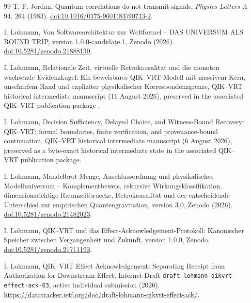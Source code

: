 \documentclass[11pt]{article}
\theoremstyle{remark}
\begin{document}
\begin{thebibliography}{99}
T. F. Jordan, Quantum correlations do not transmit signals,
\emph{Physics Letters A} 94, 264 (1983).
\href{https://doi.org/10.1016/0375-9601(83)90713-2}{doi:10.1016/0375-9601(83)90713-2}.

I. Lohmann, Von Softwarearchitektur zur Weltformel -- DAS UNIVERSUM ALS
ROUND TRIP, version 1.0.0-candidate.1, Zenodo (2026).
\href{https://doi.org/10.5281/zenodo.21888130}{doi:10.5281/zenodo.21888130}.

I. Lohmann, Relationale Zeit, virtuelle Retrokausalitat und die monoton
wachsende Evidenzkugel: Ein beweisbares QIK--VRT-Modell mit massivem Kern,
unscharfem Rand und expliziter physikalischer Korrespondenzgrenze,
QIK--VRT historical intermediate manuscript (11 August 2026), preserved in
the associated QIK--VRT publication package \cite{LohmannRoundTrip2026}.

I. Lohmann, Decision Sufficiency, Delayed Choice, and Witness-Bound Recovery:
QIK--VRT: formal boundaries, finite verification, and provenance-bound
continuation, QIK--VRT historical intermediate manuscript (6 August 2026),
preserved as a byte-exact historical intermediate state in the associated
QIK--VRT publication package.

I. Lohmann, Mandelbrot-Menge, Anschlussordnung und physikalisches
Modelluniversum -- Komplementbeweis, rekursive Wirkungsklassifikation,
dimensionsrichtige Raumzeitbruecke, Retrokausalitat und der entscheidende
Unterschied zur empirischen Quantengravitation, version 3.0, Zenodo (2026).
\href{https://doi.org/10.5281/zenodo.21482023}{doi:10.5281/zenodo.21482023}.

I. Lohmann, QIK--VRT und das Effect-Acknowledgement-Protokoll: Kanonischer
Speicher zwischen Vergangenheit und Zukunft, version 1.0.0, Zenodo.
\href{https://doi.org/10.5281/zenodo.21711193}{doi:10.5281/zenodo.21711193}.

I. Lohmann, QIK--VRT Effect Acknowledgement: Separating Receipt from
Authorization for Downstream Effect, Internet-Draft
\texttt{draft-lohmann-qikvrt-effect-ack-03}, active individual submission
(2026). \url{https://datatracker.ietf.org/doc/draft-lohmann-qikvrt-effect-ack/}.

\end{thebibliography}
\end{document}
